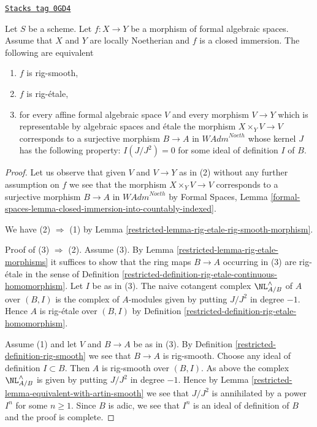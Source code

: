 \begin{lemma}
\label{restricted-lemma-closed-immersion-rig-smooth}
\href{https://stacks.math.columbia.edu/tag/0GD4}{\texttt{Stacks tag 0GD4}}

Let $S$ be a scheme. Let $f : X \to Y$ be a morphism of formal algebraic
spaces. Assume that $X$ and $Y$ are locally Noetherian and $f$ is a
closed immersion. The following are equivalent
\begin{enumerate}
\item $f$ is rig-smooth,
\item $f$ is rig-\'etale,
\item for every affine formal algebraic space $V$ and every morphism
$V \to Y$ which is representable by algebraic spaces and \'etale
the morphism $X \times_Y V \to V$ corresponds to a surjective morphism
$B \to A$ in $\textit{WAdm}^{Noeth}$ whose kernel $J$ has the following
property: $I(J/J^2) = 0$ for some ideal of definition $I$ of $B$.
\end{enumerate}
\end{lemma}

\begin{proof}

Let us observe that given $V$ and $V \to Y$ as in (2) without any
further assumption on $f$ we see that the morphism $X \times_Y V \to V$
corresponds to a surjective morphism $B \to A$ in $\textit{WAdm}^{Noeth}$
by Formal Spaces, Lemma
\ref{formal-spaces-lemma-closed-immersion-into-countably-indexed}.

\medskip\noindent
We have (2) $\Rightarrow$ (1) by
Lemma \ref{restricted-lemma-rig-etale-rig-smooth-morphism}.

\medskip\noindent
Proof of (3) $\Rightarrow$ (2). Assume (3). By
Lemma \ref{restricted-lemma-rig-etale-morphisms}
it suffices to show that the ring maps
$B \to A$ occurring in (3) are rig-\'etale in the
sense of Definition \ref{restricted-definition-rig-etale-continuous-homomorphism}.
Let $I$ be as in (3). The naive cotangent complex
$\NL_{A/B}^\wedge$ of $A$ over $(B, I)$ is the complex of $A$-modules
given by putting $J/J^2$ in degree $-1$. Hence $A$ is
rig-\'etale over $(B, I)$ by
Definition \ref{restricted-definition-rig-etale-homomorphism}.

\medskip\noindent
Assume (1) and let $V$ and $B \to A$ be as in (3).
By Definition \ref{restricted-definition-rig-smooth} we see that
$B \to A$ is rig-smooth. Choose any ideal of definition $I \subset B$.
Then $A$ is rig-smooth over $(B, I)$.
As above the complex $\NL_{A/B}^\wedge$ is
given by putting $J/J^2$ in degree $-1$.
Hence by Lemma \ref{restricted-lemma-equivalent-with-artin-smooth}
we see that $J/J^2$ is annihilated by
a power $I^n$ for some $n \geq 1$. Since $B$ is adic, we see
that $I^n$ is an ideal of definition of $B$ and the
proof is complete.
\end{proof}

